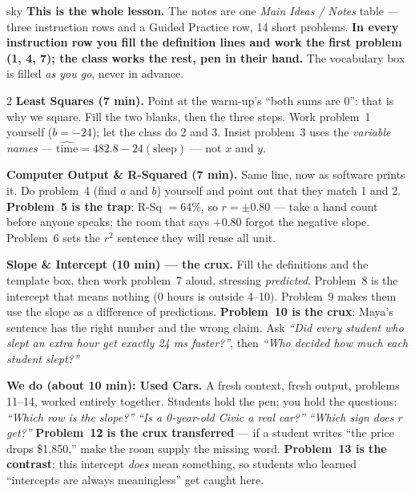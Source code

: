 \documentclass[10pt]{article}
\begin{document}
\boxguard
\begin{skillbox}{sky}
\textbf{This is the whole lesson.} The notes are one \emph{Main Ideas / Notes} table --- three
instruction rows and a Guided Practice row, 14 short problems. \textbf{In every instruction row
you fill the definition lines and work the first problem (1, 4, 7); the class works the rest,
pen in their hand.} The vocabulary box is filled \emph{as you go}, never in advance.
\begin{multicols}{2}
\textbf{Least Squares (7 min).} Point at the warm-up's ``both sums are 0'': that is why we
square. Fill the two blanks, then the three steps. Work problem~1 yourself ($b = -24$); let the
class do 2 and 3. Insist problem~3 uses the \emph{variable names} ---
$\widehat{\text{time}} = 482.8 - 24(\text{sleep})$ --- not $x$ and $y$.

\textbf{Computer Output \& R-Squared (7 min).} Same line, now as software prints it. Do
problem~4 (find $a$ and $b$) yourself and point out that they match 1 and 2. \textbf{Problem~5
is the trap}: R-Sq $= 64\%$, so $r = \pm 0.80$ --- take a hand count before anyone speaks; the
room that says $+0.80$ forgot the negative slope. Problem~6 sets the $r^2$ sentence they will
reuse all unit.

\textbf{Slope \& Intercept (10 min) --- the crux.} Fill the definitions and the template box,
then work problem~7 aloud, stressing \emph{predicted}. Problem~8 is the intercept that means
nothing (0 hours is outside 4--10). Problem~9 makes them use the slope as a difference of
predictions. \textbf{Problem~10 is the crux}: Maya's sentence has the right number and the wrong
claim. Ask \emph{``Did every student who slept an extra hour get exactly 24 ms faster?''}, then
\emph{``Who decided how much each student slept?''}

\columnbreak
\textbf{We do (about 10 min): Used Cars.} A fresh context, fresh output, problems 11--14,
worked entirely together. Students hold the pen; you hold the questions: \emph{``Which row is
the slope?''} \quad \emph{``Is a 0-year-old Civic a real car?''} \quad \emph{``Which sign does
$r$ get?''} \textbf{Problem~12 is the crux transferred} --- if a student writes ``the price
drops \$1,850,'' make the room supply the missing word. \textbf{Problem~13 is the contrast}:
this intercept \emph{does} mean something, so students who learned ``intercepts are always
meaningless'' get caught here.


\end{multicols}
\end{skillbox}
\end{document}
